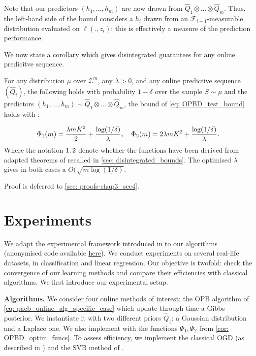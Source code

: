 Note that our predictors $(h_1,...,h_m)$ are now drawn from $\hat{Q}_1\otimes...\otimes \hat{Q}_{m}$. Thus, the left-hand side of the bound considers a $h_i$ drawn from an $\mathcal{F}_{i-1}$-measurable distribution evaluated on $\ell(.,z_i)$: this is effectively a measure of the prediction performance.

We now state a corollary which gives disintegrated guarantees for any online predicitve sequence.

\begin{corollary}
  \label{cor: OPBD_test_bound}
  For any distribution $\mu$ over $\mathcal{Z}^m$, any $\lambda>0$, and any online predictive sequence $(\hat{Q}_i)$, the following holds with probability $1-\delta$ over the sample $S\sim \mu$ and the predictors $(h_1,...,h_m)\sim \hat{Q}_1\otimes...\otimes \hat{Q}_m$, the bound of \cref{eq: OPBD_test_bound} holds with  :

  \begin{align*}
    \Phi_{\normalfont1}(m)= \frac{\lambda m K^2}{2} + \frac{\log(1/\delta)}{\lambda}, \quad \Phi_{\normalfont2}(m) = 2\lambda m K^2 + \frac{\log(1/\delta)}{\lambda}.
  \end{align*}
  Where the notation $\normalfont1, \normalfont2$ denote whether the functions have been derived from adapted theorems of \citealp{rivasplata2020pac,viallard2023general} recalled in \cref{sec: disintegrated_bounds}. The optimised $\lambda$ gives in both cases a $O(\sqrt{m\log(1/\delta)}$.
\end{corollary}

 Proof is deferred to \cref{sec: proofs-chap3_sec4}.

\section{Experiments}
\label{sec: experiments}

We adapt the experimental framework introduced in \citet[Sec.5]{cherief2019generalization} to our algorithms (anonymised code available \href{https://anonymous.4open.science/r/Online-PAC-Bayes-learning-044F}{here}). We conduct experiments on several real-life datasets, in classification and
linear regression. Our objective is twofold: check the convergence of our learning methods and compare their efficiencies with classical algorithms. We first introduce our experimental setup.

\textbf{Algorithms.}
We consider four online methods of interest: the OPB algorithm of \cref{eq: pacb_online_alg_specific_case} which update through time a Gibbs posterior. We instantiate it with two different priors $\hat{Q}_1$: a Gaussian distribution and a Laplace one. We also implement  with the functions $\Psi_1,\Psi_2$ from \cref{cor: OPBD_optim_funcs}.
To assess efficiency, we implement the classical OGD (as described in \citealp[Alg. 1 of][]{zinkevich2003online}) and the SVB method of \citet{cherief2019generalization}.

